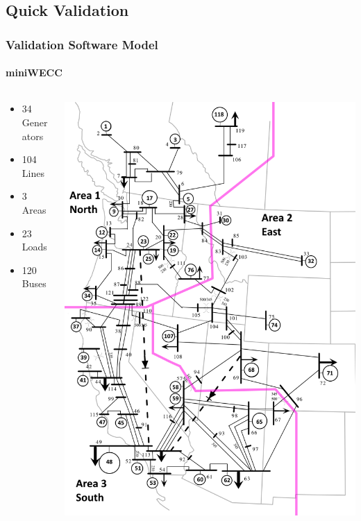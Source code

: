 \documentclass[14pt, unknownkeysallowed]{beamer}
\begin{document}
\subsection{Quick Validation}
\begin{frame}
\frametitle{Validation Software Model}
\framesubtitle{miniWECC}
\begin{columns}
	\begin{column}{0.45\textwidth}
		\begin{itemize}
			\item 34 Generators
			\item 104 Lines
			\item 3 Areas
			\item 23 Loads
			\item 120 Buses
		\end{itemize}
	\end{column}
	\begin{column}{.5\textwidth}
		\includegraphics[height=.8\textheight]{miniWECC_split03} 
		{\tiny\cite{RJminiWECC}}%
	\end{column}
\end{columns}
\end{frame}
\end{document}
